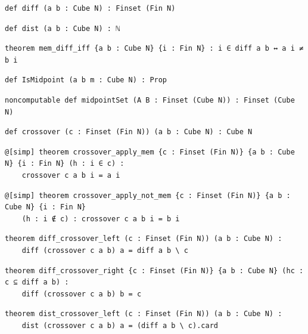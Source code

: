 \begin{lstlisting}[style=leancat]
def diff (a b : Cube N) : Finset (Fin N)
\end{lstlisting}

\begin{lstlisting}[style=leancat]
def dist (a b : Cube N) : ℕ
\end{lstlisting}

\begin{lstlisting}[style=leancat]
theorem mem_diff_iff {a b : Cube N} {i : Fin N} : i ∈ diff a b ↔ a i ≠ b i
\end{lstlisting}

\begin{lstlisting}[style=leancat]
def IsMidpoint (a b m : Cube N) : Prop
\end{lstlisting}

\begin{lstlisting}[style=leancat]
noncomputable def midpointSet (A B : Finset (Cube N)) : Finset (Cube N)
\end{lstlisting}

\begin{lstlisting}[style=leancat]
def crossover (c : Finset (Fin N)) (a b : Cube N) : Cube N
\end{lstlisting}

\begin{lstlisting}[style=leancat]
@[simp] theorem crossover_apply_mem {c : Finset (Fin N)} {a b : Cube N} {i : Fin N} (h : i ∈ c) :
    crossover c a b i = a i
\end{lstlisting}

\begin{lstlisting}[style=leancat]
@[simp] theorem crossover_apply_not_mem {c : Finset (Fin N)} {a b : Cube N} {i : Fin N}
    (h : i ∉ c) : crossover c a b i = b i
\end{lstlisting}

\begin{lstlisting}[style=leancat]
theorem diff_crossover_left (c : Finset (Fin N)) (a b : Cube N) :
    diff (crossover c a b) a = diff a b \ c
\end{lstlisting}

\begin{lstlisting}[style=leancat]
theorem diff_crossover_right {c : Finset (Fin N)} {a b : Cube N} (hc : c ⊆ diff a b) :
    diff (crossover c a b) b = c
\end{lstlisting}

\begin{lstlisting}[style=leancat]
theorem dist_crossover_left (c : Finset (Fin N)) (a b : Cube N) :
    dist (crossover c a b) a = (diff a b \ c).card
\end{lstlisting}


